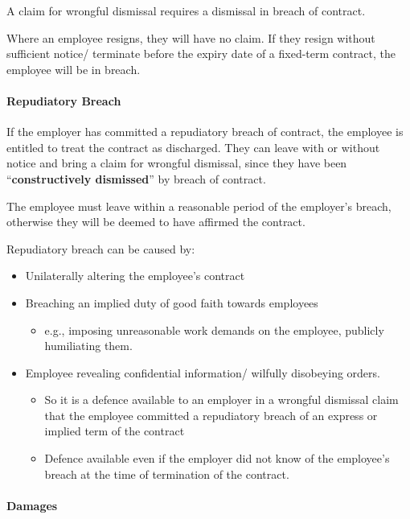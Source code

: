 \documentclass[
]{article}
\providecommand{\tightlist}{%
  \setlength{\itemsep}{0pt}\setlength{\parskip}{0pt}}
\begin{document}
A claim for wrongful dismissal requires a dismissal in breach of
contract.

Where an employee resigns, they will have no claim. If they resign
without sufficient notice/ terminate before the expiry date of a
fixed-term contract, the employee will be in breach.

\hypertarget{repudiatory-breach}{%
\paragraph{Repudiatory Breach}\label{repudiatory-breach}}

If the employer has committed a repudiatory breach of contract, the
employee is entitled to treat the contract as discharged. They can leave
with or without notice and bring a claim for wrongful dismissal, since
they have been ``\textbf{constructively dismissed}'' by breach of
contract.

The employee must leave within a reasonable period of the employer's
breach, otherwise they will be deemed to have affirmed the contract.

Repudiatory breach can be caused by:

\begin{itemize}
\tightlist
\item
  Unilaterally altering the employee's contract
\item
  Breaching an implied duty of good faith towards employees

  \begin{itemize}
  \tightlist
  \item
    e.g., imposing unreasonable work demands on the employee, publicly
    humiliating them.
  \end{itemize}
\item
  Employee revealing confidential information/ wilfully disobeying
  orders.

  \begin{itemize}
  \tightlist
  \item
    So it is a defence available to an employer in a wrongful dismissal
    claim that the employee committed a repudiatory breach of an express
    or implied term of the contract
  \item
    Defence available even if the employer did not know of the
    employee's breach at the time of termination of the contract.
  \end{itemize}
\end{itemize}

\hypertarget{damages}{%
\paragraph{Damages}\label{damages}}
\end{document}
